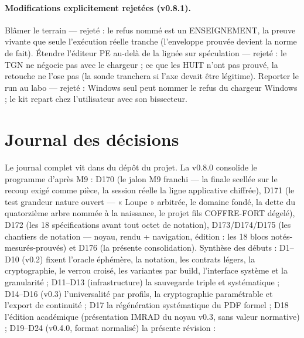 \paragraph{Modifications explicitement rejetées (v0.8.1).} Blâmer le terrain —
rejeté : le refus nommé est un ENSEIGNEMENT, la preuve vivante que seule
l'exécution réelle tranche (l'enveloppe prouvée devient la norme de fait).
Étendre l'éditeur PE au-delà de la lignée sur spéculation — rejeté : le TGN ne
négocie pas avec le chargeur ; ce que les HUIT n'ont pas prouvé, la retouche ne
l'ose pas (la sonde tranchera si l'axe devait être légitime). Reporter le run au
labo — rejeté : Windows seul peut nommer le refus du chargeur Windows ; le kit
repart chez l'utilisateur avec son bissecteur.

\section{Journal des décisions}\label{sec:decisions}

Le journal complet vit dans  du dépôt du projet. La
v0.8.0 consolide le programme d'après M9 : D170 (le jalon M9 franchi — la finale
 scellée sur le recoup exigé comme pièce, la session réelle la ligne
applicative chiffrée), D171 (le test grandeur nature ouvert — « Loupe » arbitrée,
le domaine  fondé, la dette du quatorzième arbre nommée à la
naissance, le projet fils COFFRE-FORT dégelé), D172 (les 18 spécifications avant
tout octet de notation), D173/D174/D175 (les chantiers de notation — noyau,
rendu + navigation, édition : les 18 blocs notés-mesurés-prouvés) et D176 (la
présente consolidation). Synthèse des débuts :
D1–D10 (v0.2) fixent l'oracle éphémère, la notation, les contrats légers, la
cryptographie, le verrou croisé, les variantes par build, l'interface système et la
granularité ; D11–D13 (infrastructure) la sauvegarde triple et systématique ; D14–D16
(v0.3) l'universalité par profils, la cryptographie paramétrable et l'export de
continuité ; D17 la régénération systématique du PDF formel ; D18 l'édition académique
(présentation IMRAD du noyau v0.3, sans valeur normative) ; D19–D24 (v0.4.0, format
normalisé) la présente révision :

